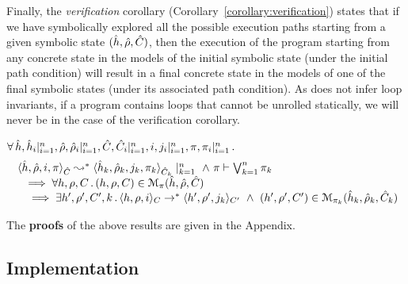 %
Finally, the \emph{verification} corollary (Corollary~\ref{corollary:verification})
states that if we have symbolically explored all the possible execution paths
starting from a given symbolic state $(\hat{h}, \hat\rho, \hat{C})$,  
then the execution of the program starting from  any concrete state in the models 
of the initial symbolic state (under the initial path condition) will result in a final concrete state
in the models of one of the final symbolic states (under its associated path condition).  
As \jilette does not infer loop invariants, if a \jsil program contains loops that cannot be unrolled statically, we will never be in the case of the verification corollary. 

\begin{corollary}[Verification]\label{corollary:verification}
$\forall \, \hat{h}, \hat{h}_i|_{i=1}^n, \hat\rho, \hat\rho_i|_{i=1}^n, 
\hat{C}, \hat{C}_i|_{i=1}^n, i, j_i|_{i=1}^n, \pi, \pi_i|_{i=1}^n \, . \,$
\vspace{-0.25cm}
$$
\begin{array}{l}
  \ \symbtranstrans{\sheap, \sstore, i, \pc}{\sheap_k, \sstore_k, j_k, \pc_k}[\sctx][\sctx_k]\mid_{k = 1}^n
      \ \wedge \ \pc \vdash \bigvee_{k=1}^n \pc_k \\ 
      \quad \implies 
         \forall \heap, \store, \ctx \, . \, (\heap, \store, \ctx) \in \smodels{\sheap, \sstore, \sctx}{\pc} \\
          \ \quad \implies \exists \heap', \store', \ctx', k\, . \, 
                  \semtranstrans{\heap, \store, i}{\heap', \store', j_k}[\ctx][\ctx'] \ \wedge \ 
                  (\heap', \store', \ctx') \in \smodels{\sheap_k, \sstore_k, \sctx_k}{\pc_k}
\end{array}   
$$ 
\end{corollary}
%
The {\bf proofs} of the above results are given in the Appendix. 


\subsection{Implementation}
\label{subsec:jsil:analysis:implementation}

